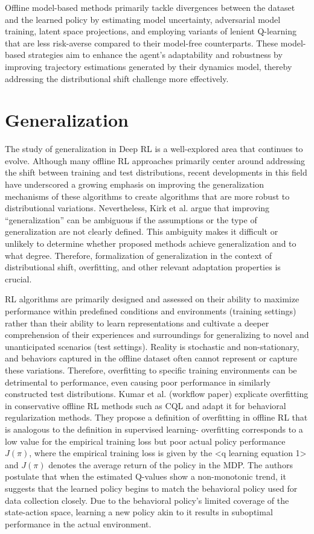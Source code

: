 Offline model-based methods primarily tackle divergences between the dataset and the learned policy by estimating model uncertainty, adversarial model training, latent space projections, and employing variants of lenient Q-learning that are less risk-averse compared to their model-free counterparts. These model-based strategies aim to enhance the agent’s adaptability and robustness by improving trajectory estimations generated by their dynamics model, thereby addressing the distributional shift challenge more effectively.

  

\section{Generalization}

 The study of generalization in Deep RL is a well-explored area that continues to evolve. Although many offline RL approaches primarily center around addressing the shift between training and test distributions, recent developments in this field have underscored a growing emphasis on improving the generalization mechanisms of these algorithms to create algorithms that are more robust to distributional variations. Nevertheless, Kirk et al. argue that improving “generalization” can be ambiguous if the assumptions or the type of generalization are not clearly defined. This ambiguity makes it difficult or unlikely to determine whether proposed methods achieve generalization and to what degree. Therefore, formalization of generalization in the context of distributional shift, overfitting, and other relevant adaptation properties is crucial. 

RL algorithms are primarily designed and assessed on their ability to maximize performance within predefined conditions and environments (training settings) rather than their ability to learn representations and cultivate a deeper comprehension of their experiences and surroundings for generalizing to novel and unanticipated scenarios (test settings). Reality is stochastic and non-stationary, and behaviors captured in the offline dataset often cannot represent or capture these variations. Therefore, overfitting to specific training environments can be detrimental to performance, even causing poor performance in similarly constructed test distributions. Kumar et al. (workflow paper) explicate overfitting in conservative offline RL methods such as CQL and adapt it for behavioral regularization methods. They propose a definition of overfitting in offline RL that is analogous to the definition in supervised learning- overfitting corresponds to a low value for the empirical training loss but poor actual policy performance $J(\pi)$, where the empirical training loss is given by the <q learning equation 1> and $J(\pi)$ denotes the average return of the policy in the MDP. The authors postulate that when the estimated Q-values show a non-monotonic trend, it suggests that the learned policy begins to match the behavioral policy used for data collection closely. Due to the behavioral policy’s limited coverage of the state-action space, learning a new policy akin to it results in suboptimal performance in the actual environment.

